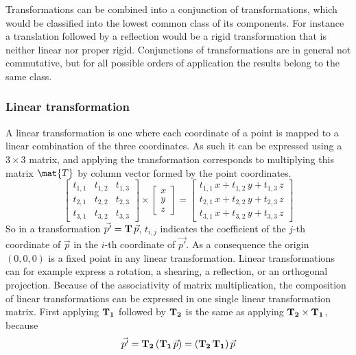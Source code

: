 Transformations can be combined into a conjunction of transformations, which would be classified into the lowest common class of its components. For instance a translation followed by a reflection would be a rigid transformation that is neither linear nor proper rigid. Conjunctions of transformations are in general not commutative, but for all possible orders of application the results belong to the same class.

\subsubsection{Linear transformation}
A linear transformation is one where each coordinate of a point is mapped to a linear combination of the three coordinates. As such it can be expressed using a $3 \times 3$ matrix, and applying the transformation corresponds to multiplying this matrix $\mat{T}$ by column vector formed by the point coordinates.
\begin{equation}
\left[ \begin{matrix}
	t_{1,1} & t_{1,2} & t_{1,3} \\
	t_{2,1} & t_{2,2} & t_{2,3} \\
	t_{3,1} & t_{3,2} & t_{3,3}
\end{matrix} \right] \times
\left[ \begin{matrix} x \\ y \\ z \end{matrix} \right] = 
\left[ \begin{matrix}
	t_{1,1} \, x + t_{1,2} \, y + t_{1,3} \, z \\
	t_{2,1} \, x + t_{2,2} \, y + t_{2,3} \, z \\
	t_{3,1} \, x + t_{3,2} \, y + t_{3,3} \, z
\end{matrix} \right]
\end{equation}
So in a transformation $\vec{p'} = \mathbf{T} \, \vec{p}$, $t_{i,j}$ indicates the coefficient of the $j$-th coordinate of $\vec{p}$ in the $i$-th coordinate of $\vec{p'}$. As a consequence the origin $(0, 0, 0)$ is a fixed point in any linear transformation. Linear transformations can for example express a rotation, a shearing, a reflection, or an orthogonal projection. Because of the associativity of matrix multiplication, the composition of linear transformations can be expressed in one single linear transformation matrix. First applying $\mathbf{T_1}$ followed by $\mathbf{T_2}$ is the same as applying $\mathbf{T_2} \times \mathbf{T_1}$, because
\begin{equation}
	\vec{p'} = \mathbf{T_2} \, ( \mathbf{T_1} \, \vec{p} ) = (\mathbf{T_2} \, \mathbf{T_1}) \, \vec{p}
\end{equation}

